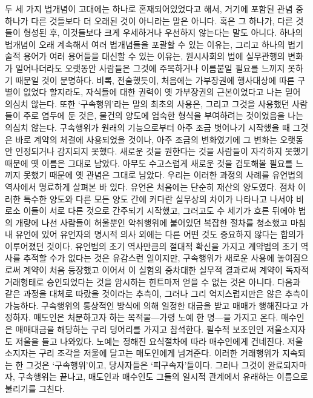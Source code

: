 두 세 가지 법개념이 고대에는 하나로 혼재되어있었다고 해서,
거기에 포함된 관념 중 하나가 다른 것들보다 더 오래된 것이 아니라는
말은 아니다.
혹은 그 하나가, 다른 것들이 형성된 후,
이것들보다 크게 우세하거나 우선하지 않는다는 말도 아니다.
하나의 법개념이 오래 계속해서 여러 법개념들을 포괄할 수 있는 이유는,
그리고 하나의 법기술적 용어가 여러 용어들을 대신할 수 있는 이유는,
원시사회의 법에 실무관행의 변화가 일어나더라도
오랫동안 사람들은 그것에 주목하거나 이름붙일
필요를 느끼지 못하기 때문일 것이 분명하다.
비록, 전술했듯이,
처음에는 가부장권에 행사대상에 따른 구별이 없었다 할지라도,
자식들에 대한 권력이 옛 가부장권의 근본이었다고
나는 믿어 의심치 않는다.
또한
`구속행위'라는 말의 최초의 사용은,
그리고 그것을 사용했던 사람들이 주로 염두에 둔 것은,
물건의 양도에 엄숙한 형식을 부여하려는 것이었음을
나는 의심치 않는다.
구속행위가 원래의 기능으로부터 아주 조금 벗어나기 시작했을 때
그것은 바로 계약의 체결에 사용되었을 것이나,
아주 조금의 변화였기에 그 변화는 오랫동안 인정되거나 감지되지 못했다.
새로운 것을 원한다는 것을 사람들이 자각하지 못했기 때문에
옛 이름은 그대로 남았다.
아무도 수고스럽게 새로운 것을 검토해볼 필요를 느끼지 못했기 때문에
옛 관념은 그대로 남았다.
우리는 이러한 과정의 사례를 유언법의 역사에서 명료하게 살펴본 바 있다.
유언은 처음에는 단순히 재산의 양도였다.
점차 이러한 특수한 양도와 다른 모든 양도 간에 커다란 실무상의 차이가
나타나고 나서야 비로소
이들이
서로 다른 것으로 간주되기 시작했고,
그러고도 수 세기가 흐른 뒤에야
법의 개량에 나선 사람들이
허울뿐인 악취행위에 붙어있던 복잡한 절차를
청소했고 마침내
유언에 있어
유언자의 명시적 의사 외에는 다른 어떤 것도 중요하지 않다는
합의가 이루어졌던 것이다.
유언법의 초기 역사만큼의
절대적 확신을 가지고
계약법의 초기 역사를 추적할 수가 없다는 것은 유감스런 일이지만,
구속행위가 새로운 사용에 놓여짐으로써
계약이 처음 등장했고
이어서
이 실험의 중차대한 실무적 결과로써
계약이 독자적 거래형태로 승인되었다는 것을 암시하는
힌트마저 얻을 수 없는 것은 아니다.
다음과 같은 과정을 대체로 따랐을 것이라는 추측이,
그러나 그리 억지스럽지만은 않은 추측이 가능하다.
구속행위의 통상적인 방식에 의해
일정한 대금을 받고 매매가 행해진다고 가정하자.
매도인은 처분하고자 하는 목적물---가령 노예 한 명---을 가지고 온다.
매수인은 매매대금을 해당하는 구리 덩어리를 가지고 참석한다.
필수적 보조인인 저울소지자도 저울을 들고 나와있다.
노예는 정해진 요식절차에 따라 매수인에게 건네진다.
저울소지자는 구리 조각을 저울에 달고는 매도인에게 넘겨준다.
이러한 거래행위가 지속되는 한 그것은 `구속행위'이고,
당사자들은 `피구속자'들이다.
그러나 그것이 완료되자마자,
구속행위는 끝나고,
매도인과 매수인도 그들의 일시적 관계에서 유래하는 이름으로 불리기를 그친다.
